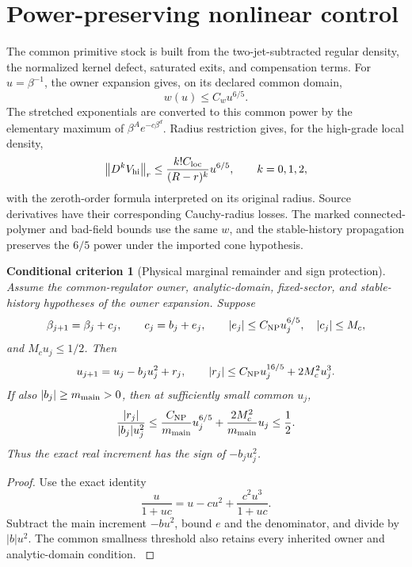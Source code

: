 \documentclass[11pt,oneside,openany]{book}
\newtheorem{criterion}[criterion]{Conditional criterion}
\theoremstyle{definition}
\theoremstyle{remark}
\newcommand{\norm}[1]{\left\lVert#1\right\rVert}
\newcommand{\src}[2]{\cite[#2]{#1}}
\begin{document}
\section{Power-preserving nonlinear control}
The common primitive stock is built from the two-jet-subtracted regular density, the normalized kernel defect, saturated exits, and compensation terms. For $u=\beta^{-1}$, the owner expansion gives, on its declared common domain,
\begin{equation}\label{eq:owner-power}
w(u)\le C_wu^{6/5}.
\end{equation}
The stretched exponentials are converted to this common power by the elementary maximum of $\beta^Ae^{-c\beta^d}$. Radius restriction gives, for the high-grade local density,
\[
\norm{D^kV_{\rm hi}}_r\le\frac{k!C_{\rm loc}}{(R-r)^k}u^{6/5},
\qquad k=0,1,2,
\]
with the zeroth-order formula interpreted on its original radius. Source derivatives have their corresponding Cauchy-radius losses. The marked connected-polymer and bad-field bounds use the same $w$, and the stable-history propagation preserves the $6/5$ power under the imported cone hypothesis. \src{PAR}{V2--V3}

\begin{criterion}[Physical marginal remainder and sign protection]\label{thm:remainder}
Assume the common-regulator owner, analytic-domain, fixed-sector, and stable-history hypotheses of the owner expansion. Suppose
\[
\beta_{j+1}=\beta_j+c_j,\qquad c_j=b_j+e_j,
\qquad |e_j|\le C_{\rm NP}u_j^{6/5},\quad |c_j|\le M_c,
\]
and $M_cu_j\le1/2$. Then
\begin{equation}\label{eq:physical-remainder}
u_{j+1}=u_j-b_ju_j^2+r_j,\qquad
|r_j|\le C_{\rm NP}u_j^{16/5}+2M_c^2u_j^3.
\end{equation}
If also $|b_j|\ge m_{\rm main}>0$, then at sufficiently small common $u_j$,
\begin{equation}\label{eq:sign-protection}
\frac{|r_j|}{|b_j|u_j^2}
\le\frac{C_{\rm NP}}{m_{\rm main}}u_j^{6/5}
+\frac{2M_c^2}{m_{\rm main}}u_j\le\frac12.
\end{equation}
Thus the exact real increment has the sign of $-b_ju_j^2$.
\end{criterion}
\begin{proof}
Use the exact identity
\[
\frac{u}{1+uc}=u-cu^2+\frac{c^2u^3}{1+uc}.
\]
Subtract the main increment $-bu^2$, bound $e$ and the denominator, and divide by $|b|u^2$. The common smallness threshold also retains every inherited owner and analytic-domain condition. \src{PAR}{V4}
\end{proof}
\end{document}
